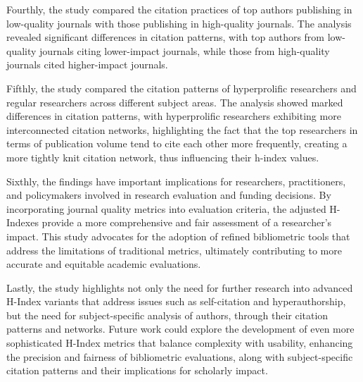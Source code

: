 Fourthly, the study compared the citation practices of top authors publishing
in low-quality journals with those publishing in high-quality journals. The
analysis revealed significant differences in citation patterns, with top
authors from low-quality journals citing lower-impact journals, while those
from high-quality journals cited higher-impact journals.

Fifthly, the study compared the citation patterns of hyperprolific researchers
and regular researchers across different subject areas. The analysis showed
marked differences in citation patterns, with hyperprolific researchers
exhibiting more interconnected citation networks, highlighting the fact that
the top researchers in terms of publication volume tend to cite each other more
frequently, creating a more tightly knit citation network, thus influencing
their h-index values.


Sixthly, the findings have important implications for researchers,
practitioners, and policymakers involved in research evaluation and funding
decisions. By incorporating journal quality metrics into evaluation criteria,
the adjusted H-Indexes provide a more comprehensive and fair assessment of a
researcher's impact. This study advocates for the adoption of refined
bibliometric tools that address the limitations of traditional metrics,
ultimately contributing to more accurate and equitable academic evaluations.

Lastly, the study highlights not only the need for further research into
advanced H-Index variants that address issues such as self-citation and
hyperauthorship, but the need for subject-specific analysis of authors, through
their citation patterns and networks. Future work could explore the development
of even more sophisticated H-Index metrics that balance complexity with
usability, enhancing the precision and fairness of bibliometric evaluations,
along with subject-specific citation patterns and their implications for
scholarly impact.


